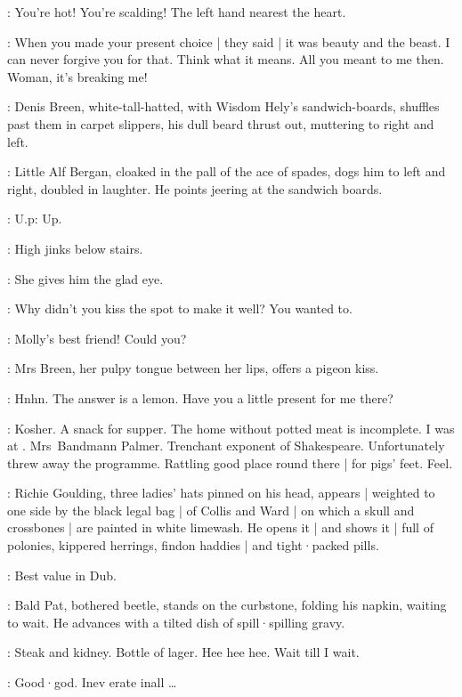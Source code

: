 \MrsBreen:
You're hot!
You're scalding!
The left hand nearest the heart.

\Bloom:
When you made your present choice |
they said |
it was beauty and the beast.
I can never forgive you for that.
Think what it means.
All you meant to me then.
Woman,
it's breaking me!

:
Denis Breen,
white-tall-hatted,
with Wisdom Hely's sandwich-boards,
shuffles past them in carpet slippers,
his dull beard thrust out,
muttering to right and left.

:
Little Alf Bergan,
cloaked in the pall of the ace of spades,
dogs him to left and right,
doubled in laughter.
He points jeering at the sandwich boards.

\AlfBergan:
U.p:
Up.

\MrsBreen:
High jinks below stairs.

:
She gives him the glad eye.

\MrsBreen:
Why didn't you kiss the spot to make it well?
You wanted to.

\Bloom:
Molly's best friend!
Could you?

:
Mrs Breen,
her pulpy tongue between her lips,
offers a pigeon kiss.

\MrsBreen:
Hnhn.
The answer is a lemon.
Have you a little present for me there?

\Bloom:
Kosher.
A snack for supper.
The home without potted meat is incomplete.
I was at .
Mrs~Bandmann Palmer.
Trenchant exponent of Shakespeare.
Unfortunately threw away the programme.
Rattling good place round there |
for pigs' feet.
Feel.

:
Richie Goulding,
three ladies' hats pinned on his head,
appears |
weighted to one side by the black legal bag |
of 
Collis and Ward |
on which a skull and crossbones |
are painted in white limewash.
He opens it |
and shows it |
full of polonies,
kippered herrings,
findon haddies |
and tight·packed pills.

\Richie:
Best value in Dub.

:
Bald Pat,
bothered beetle,
stands on the curbstone,
folding his napkin,
waiting to wait.
He advances with a tilted dish of spill·spilling gravy.

\Pat:
Steak and kidney.
Bottle of lager.
Hee hee hee.
Wait till I wait.

\Richie[2]:
Good·god.
Inev erate inall \ldots

